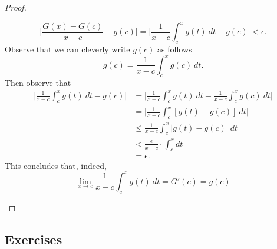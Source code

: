 \begin{proof}
\begin{enumerate}
		\[  \Big| \frac{ G(x) - G(c)  }{ x  -c  } - g(c)  \Big| = \Big| \frac{ 1 }{ x - c  } \int_{ c }^{ x } g(t) \ dt - g(c) \Big|  < \epsilon. \]
	Observe that we can cleverly write \( g(c)  \) as follows	
	\[  g(c) = \frac{ 1 }{ x -c  } \int_{ c }^{ x } g(c) \  dt. \] Then observe that 
	\begin{align*}
	    \Big| \frac{ 1 }{ x -c  } \int_{ c }^{ x } g(t) \  dt - g(c)  \Big| &= \Big| \frac{ 1 }{ x -c  } \int_{ c }^{ x } g(t)  \ dt - \frac{ 1 }{ x -c  } \int_{ c }^{ x } g(c) \   dt \Big|  \\
																			&= \Big| \frac{ 1 }{ x -c  } \int_{ c }^{ x } [ g(t) - g(c) ] \ dt \Big| \\
																			&\leq \frac{ 1 }{ x -c  } \int_{ c }^{ x } | g(t) - g(c) | \  dt \\
																			&< \frac{ \epsilon  }{ x- c  } \cdot \int_{ c }^{ x } dt  \\ 
																			&= \epsilon.
	\end{align*}
	This concludes that, indeed, 
	\[  \lim_{ x \to c } \frac{ 1 }{x -c  } \int_{ c }^{ x } g(t) \ dt = G'(c) = g(c) \]
\end{enumerate}
\end{proof}

\subsection{Exercises}



